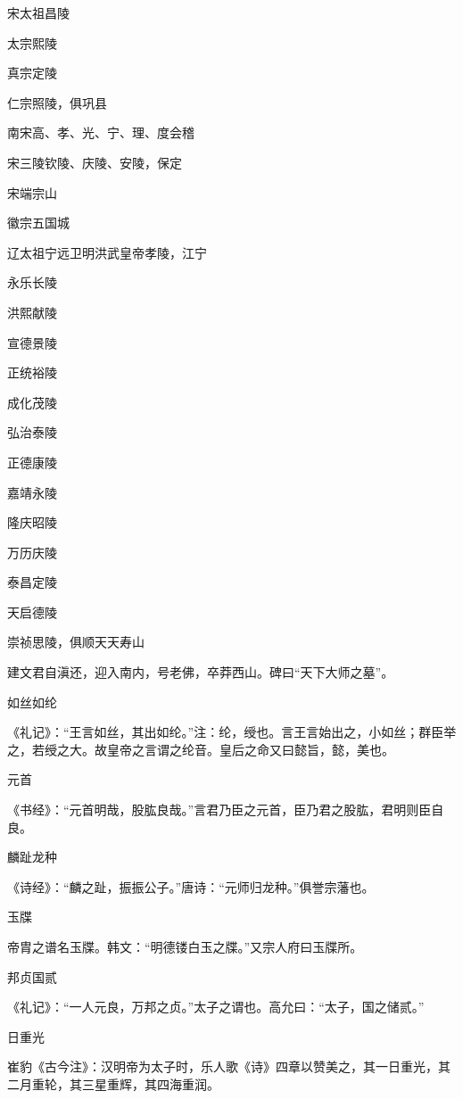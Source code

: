 \documentclass[a4paper,12pt,UTF8,twoside]{ctexbook}
\begin{document}
    宋太祖昌陵
    
    太宗熙陵
    
    真宗定陵
    
    仁宗照陵，俱巩县
    
    南宋高、孝、光、宁、理、度会稽
    
    宋三陵钦陵、庆陵、安陵，保定
    
    宋端宗山
    
    徽宗五国城
    
    辽太祖宁远卫明洪武皇帝孝陵，江宁
    
    永乐长陵
    
    洪熙献陵
    
    宣德景陵
    
    正统裕陵
    
    成化茂陵
    
    弘治泰陵
    
    正德康陵
    
    嘉靖永陵
    
    隆庆昭陵
    
    万历庆陵
    
    泰昌定陵
    
    天启德陵
    
    崇祯思陵，俱顺天天寿山
    
    建文君自滇还，迎入南内，号老佛，卒莽西山。碑曰“天下大师之墓”。
    
    
    如丝如纶
    
    《礼记》：“王言如丝，其出如纶。”注：纶，绶也。言王言始出之，小如丝；群臣举之，若绶之大。故皇帝之言谓之纶音。皇后之命又曰懿旨，懿，美也。
    
    元首
    
    《书经》：“元首明哉，股肱良哉。”言君乃臣之元首，臣乃君之股肱，君明则臣自良。
    
    麟趾龙种
    
    《诗经》：“麟之趾，振振公子。”唐诗：“元师归龙种。”俱誉宗藩也。
    
    玉牒
    
    帝胄之谱名玉牒。韩文：“明德镂白玉之牒。”又宗人府曰玉牒所。
    
    邦贞国贰
    
    《礼记》：“一人元良，万邦之贞。”太子之谓也。高允曰：“太子，国之储贰。”
    
    日重光
    
    崔豹《古今注》：汉明帝为太子时，乐人歌《诗》四章以赞美之，其一日重光，其二月重轮，其三星重辉，其四海重润。
    
\end{document}
